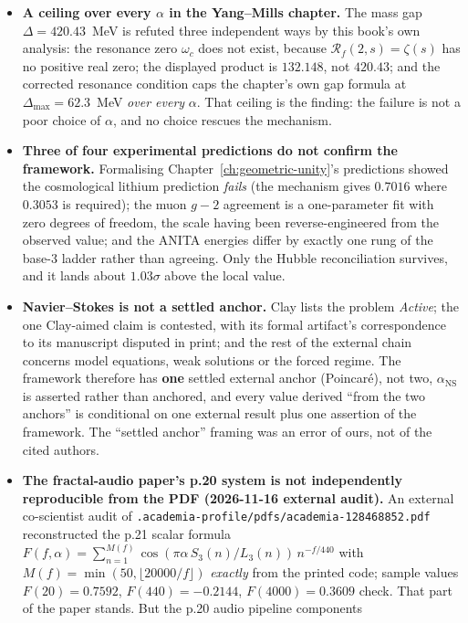 \begin{itemize}
\item \textbf{A ceiling over every $\alpha$ in the Yang--Mills chapter.} The
mass gap $\Delta = 420.43$~MeV is refuted three independent ways by this
book's own analysis: the resonance zero $\omega_c$ does not exist, because
$\mathcal{R}_f(2,s) = \zeta(s)$ has no positive real zero; the displayed
product is $132.148$, not $420.43$; and the corrected resonance condition caps
the chapter's own gap formula at $\Delta_{\max} = 62.3$~MeV \emph{over every}
$\alpha$. That ceiling is the finding: the failure is not a poor choice of
$\alpha$, and no choice rescues the mechanism.
\item \textbf{Three of four experimental predictions do not confirm the
framework.} Formalising Chapter~\ref{ch:geometric-unity}'s predictions showed
the cosmological lithium prediction \emph{fails} (the mechanism gives
$0.7016$ where $0.3053$ is required); the muon $g-2$ agreement is a
one-parameter fit with zero degrees of freedom, the scale having been
reverse-engineered from the observed value; and the ANITA energies differ by
exactly one rung of the base-3 ladder rather than agreeing. Only the Hubble
reconciliation survives, and it lands about $1.03\sigma$ above the local value.
\item \textbf{Navier--Stokes is not a settled anchor.} Clay lists the problem
\emph{Active}; the one Clay-aimed claim is contested, with its formal
artifact's correspondence to its manuscript disputed in print; and the rest of
the external chain concerns model equations, weak solutions or the forced
regime. The framework therefore has \textbf{one} settled external anchor
(Poincaré), not two, $\alpha_{\mathrm{NS}}$ is asserted rather than anchored,
and every value derived ``from the two anchors'' is conditional on one external
result plus one assertion of the framework. The ``settled anchor'' framing was
an error of ours, not of the cited authors.
\item \textbf{The fractal-audio paper's p.20 system is not independently
reproducible from the PDF (2026-11-16 external audit).}
An external co-scientist audit of
\texttt{.academia-profile/pdfs/academia-128468852.pdf} reconstructed the
p.21 scalar formula $F(f,\alpha) = \sum_{n=1}^{M(f)} \cos(\pi \alpha\, S_3(n)/L_3(n))\, n^{-f/440}$
with $M(f) = \min(50, \lfloor 20000/f \rfloor)$ \emph{exactly} from the
printed code; sample values $F(20)=0.7592$, $F(440)=-0.2144$, $F(4000)=0.3609$
check. That part of the paper stands. But the p.20 audio pipeline components

\end{itemize}
